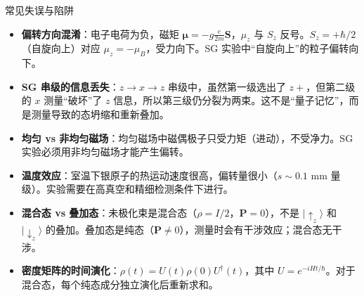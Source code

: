 \begin{errorbox}{常见失误与陷阱}
\begin{itemize}
    \item \textbf{偏转方向混淆}：电子电荷为负，磁矩 $\boldsymbol{\mu}=-g\frac{e}{2m}\mathbf{S}$，$\mu_z$ 与 $S_z$ 反号。$S_z=+\hbar/2$（自旋向上）对应 $\mu_z=-\mu_B$，受力向下。SG 实验中``自旋向上''的粒子偏转向下。
    \item \textbf{SG 串级的信息丢失}：$z\to x\to z$ 串级中，虽然第一级选出了 $z+$，但第二级的 $x$ 测量``破坏''了 $z$ 信息，所以第三级仍分裂为两束。这不是``量子记忆''，而是测量导致的态坍缩和重新叠加。
    \item \textbf{均匀 vs 非均匀磁场}：均匀磁场中磁偶极子只受力矩（进动），不受净力。SG 实验必须用非均匀磁场才能产生偏转。
    \item \textbf{温度效应}：室温下银原子的热运动速度很高，偏转量很小（$s\sim0.1$ mm 量级）。实验需要在高真空和精细检测条件下进行。
    \item \textbf{混合态 vs 叠加态}：未极化束是混合态（$\rho=I/2$，$\mathbf{P}=0$），不是 $|\uparrow_z\rangle$ 和 $|\downarrow_z\rangle$ 的叠加。叠加态是纯态（$\mathbf{P}\neq0$），测量时会有干涉效应；混合态无干涉。
    \item \textbf{密度矩阵的时间演化}：$\rho(t)=U(t)\rho(0)U^\dagger(t)$，其中 $U=e^{-iHt/\hbar}$。对于混合态，每个纯态成分独立演化后重新求和。
\end{itemize}
\end{errorbox}

